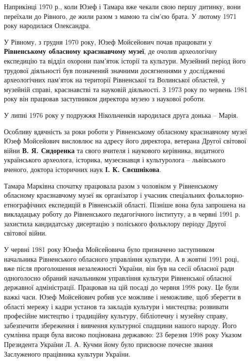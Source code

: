 
Наприкінці 1970 р., коли Юзеф і Тамара вже чекали свою першу дитинку, вони
переїхали до Рівного, де жили разом з мамою та сім'єю брата. У лютому 1971 року
народилася Олександра.

У Рівному, з грудня 1970 року, Юзеф Мойсейович почав працювати у \textbf{Рівненському
обласному краєзнавчому музеї}, де очолив археологічну експедицію та відділ
охорони пам'яток історії та культури. Музейний період його трудової діяльності
був позначений значними досягненнями у дослідженні археологічних пам'яток на
території Рівненської та Волинської областей, у музейній справі, краєзнавстві
та науковій діяльності. З 1973 року по червень 1981 року він працював
заступником директора музею з наукової роботи.


У липні 1976 року у подружжя Нікольченків народилася друга донька – Марія.

Особливу вдячність за роки роботи у Рівненському обласному краєзнавчому музеї
Юзеф Мойсейович висловлює на адресу його директора, ветерана Другої світової
війни \textbf{В. Я. Сидоренка} та свого вчителя і наукового керівника,
видатного українського археолога, історика, музеєзнавця і культуролога –
львівського вченого, доктора історичних наук \textbf{І. К. Свєшнікова}.

Тамара Марківна спочатку працювала разом з чоловіком у Рівненському обласному
краєзнавчому музеї як організатор і учасник спеціальних
фольклорно-етнографічних експедицій в Рівненській області. Пізніше вона була
запрошена на викладацьку роботу до Рівненського педагогічного інституту, а в
червні 1991 р. захистила кандидатську дисертацію з поліського фольклору періоду
Другої світової війни.


У червні 1981 року Юзефа Мойсейовича було призначено заступником начальника
Рівненського обласного управління культури. А в жовтні 1991 році, вже після
проголошення незалежності України, він був на сесії обласної ради одноголосно
обраний начальником управління культури Рівненської обласної державної
адміністрації. Працював на цій посаді до червня 1998 року. Це були важкі часи.
Юзеф Мойсейович робив усе можливе і неможливе, щоб зберегти в області мережу і
кадри установ та закладів культури і мистецтва; розвивати професійне мистецтво
і традиційну культуру, бібліотечну і музейну справу, забезпечити збереження і
вивчення культурної спадщини нашого народу. Його сумлінна праця була високо
поцінована державою: 23 березня 1998 року Указом Президента України Л. А. Кучми
йому було присвоєне почесне звання Заслуженого працівника культури України.

